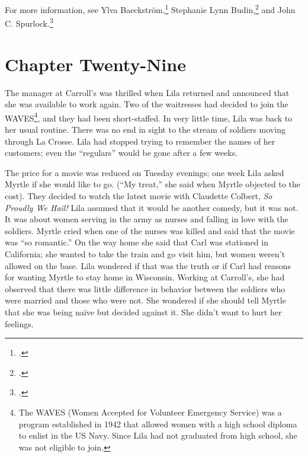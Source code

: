 \documentclass[
  american,
  letterpaper,
]{book}
\begin{document}
For more information, see Ylva Baeckström,\footnote{.} Stephanie Lynn Budin,\footnote{.} and John C. Spurlock.\footnote{.}


\chapter{Chapter Twenty-Nine}\label{chapter-twenty-nine}

The manager at Carroll's was thrilled when Lila returned and announced
that she was available to work again. Two of the waitresses had decided
to join the WAVES\footnote{The WAVES (Women Accepted for Volunteer
  Emergency Service) was a program established in 1942 that allowed
  women with a high school diploma to enlist in the US Navy. Since Lila
  had not graduated from high school, she was not eligible to join.},
and they had been short-staffed. In very little time, Lila was back to
her usual routine. There was no end in sight to the stream of soldiers
moving through La Crosse. Lila had stopped trying to remember the names
of her customers; even the ``regulars'' would be gone after a few weeks.

The price for a movie was reduced on Tuesday evenings; one week Lila
asked Myrtle if she would like to go. (``My treat,'' she said when
Myrtle objected to the cost). They decided to watch the latest movie
with Claudette Colbert, \emph{So Proudly We Hail!} Lila assumed that it
would be another comedy, but it was not. It was about women serving in
the army as nurses and falling in love with the soldiers. Myrtle cried
when one of the nurses was killed and said that the movie was ``so
romantic.'' On the way home she said that Carl was stationed in
California; she wanted to take the train and go visit him, but women
weren't allowed on the base. Lila wondered if that was the truth or if
Carl had reasons for wanting Myrtle to stay home in Wisconsin. Working
at Carroll's, she had observed that there was little difference in
behavior between the soldiers who were married and those who were not.
She wondered if she should tell Myrtle that she was being naïve but
decided against it. She didn't want to hurt her feelings.
\end{document}
